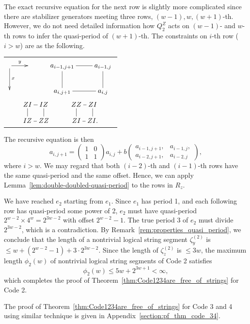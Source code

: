 \documentclass[letterpaper,10pt,pra,aps,showpacs,twocolumn]{revtex4-1}
\theoremstyle{definition} \newtheorem{defn}{Definition}
\theoremstyle{definition} \newtheorem{remark}{Remark}
\begin{document}
The exact recursive equation for the next row is slightly more complicated since there are stabilizer generators meeting three rows, $(w-1), w, (w+1)$-th. However, we do not need detailed information how $Q_2^Z$ acts on $(w-1)$- and $w$-th rows to infer the quasi-period of $(w+1)$-th. The constraints on $i$-th row ($i > w$) are as the following.
\begin{center}
\begin{tabular}{c}
$\xymatrix{
\ar[r]^y \ar[d]^x &  & a_{i-1,j+1} \ar@{-}[d] \ar@{-}[r] & a_{i-1,j}\\
                  &  & a_{i,j+1}   & a_{i,j} \ar@{-}[u] \ar@{-}[l] 
}$ \\
$ \xymatrix@!0{
 ZI \ar@{-}[d] \ar@{-}[r]& IZ & & ZZ\ar@{-}[d] \ar@{-}[r] & ZI \\
 IZ & ZZ\ar@{-}[u] \ar@{-}[l]  & & ZI & ZI . \ar@{-}[u] \ar@{-}[l] 
}$
\end{tabular}
\end{center}
The recursive equation is then
\[
 a_{i,j+1} = \begin{pmatrix} 1 & 0 \\ 1 & 1 \end{pmatrix} a_{i,j} 
   + b\begin{pmatrix} a_{i-1,j+1} ,& a_{i-1,j},\\ a_{i-2,j+1} ,& a_{i-2,j} \end{pmatrix},
\]
where $i > w$. We may regard that both $(i-2)$-th and $(i-1)$-th rows have the same quasi-period and the same offset. Hence, we can apply Lemma~\ref{lem:double-doubled-quasi-period} to the rows in $R_z$.

We have reached $e_2$ starting from $e_1$. Since $e_1$ has period 1, and each following row has quasi-period some power of 2, $e_2$ must have quasi-period $2^{w-2} \times 4^{w} = 2^{3w-2}$ with offset $2^{w-2}-1$. The true period 3 of $e_2$ must divide $2^{3w-2}$, which is a contradiction. By Remark~\ref{rem:properties_quasi_period}, we conclude that the length of a nontrivial logical string segment $\zeta^{(2)}_y$ is $ \leq w + (2^{w-2}-1) + 3 \cdot 2^{3w-2}$. Since the length of $\zeta^{(2)}_z$ is $\leq 3w$, the maximum length $\phi_2(w)$ of nontrivial logical string segments of Code 2 satisfies
\[
\phi_2(w) \leq 5w + 2^{3w+1} < \infty,
\]
which completes the proof of Theorem~\ref{thm:Code1234are_free_of_strings} for Code 2.

The proof of Theorem~\ref{thm:Code1234are_free_of_strings} for Code 3 and 4 using similar technique is given in Appendix~\ref{section:pf_thm_code_34}.
\end{document}
